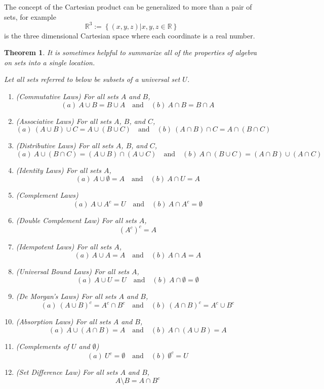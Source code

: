 \documentclass[
]{book}
\newtheorem{theorem}{Theorem}[chapter]
\theoremstyle{definition}
\theoremstyle{definition}
\theoremstyle{definition}
\theoremstyle{remark}
\begin{document}
The concept of the Cartesian product can be generalized to more than a pair of sets, for example \[\mathbb{R}^3:= \left\{ (x,y,z) \vert x,y,z\in \mathbb{R} \right\}\] is the three dimensional Cartesian space where each coordinate is a real number.

\begin{theorem}
\protect\hypertarget{thm:set-identities}{}{\label{thm:set-identities} }It is sometimes helpful to summarize all of the properties of algebra on sets into a single location.

Let all sets referred to below be subsets of a universal set \(U\).

\begin{enumerate}
\def\labelenumi{\arabic{enumi}.}
\item
  (Commutative Laws) For all sets \(A\) and \(B\),
  \[(a) \: A \cup B = B \cup A \quad \mbox{and} \quad (b) \: A \cap B = B \cap A\]
\item
  (Associative Laws) For all sets \(A\), \(B\), and \(C\),
  \[(a) \: (A\cup B)\cup C = A \cup (B \cup C) \quad \mbox{and} \quad (b) \: (A \cap B) \cap C = A \cap (B\cap C)\]
\item
  (Distributive Laws) For all sets \(A\), \(B\), and \(C\),
  \[(a) \: A \cup (B \cap C) = (A \cup B)\cap (A \cup C) \quad \mbox{and} \quad (b) \: A \cap (B \cup C) = (A \cap B)\cup (A \cap C)\]
\item
  (Identity Laws) For all sets \(A\),
  \[(a) \: A \cup \emptyset = A \quad \mbox{and} \quad (b) \: A \cap U = A\]
\item
  (Complement Laws)
  \[(a) \: A \cup A^c = U \quad \mbox{and} \quad (b) \: A \cap A^c = \emptyset\]
\item
  (Double Complement Law) For all sets \(A\),
  \[(A^c)^c =A\]
\item
  (Idempotent Laws) For all sets \(A\),
  \[(a) \: A\cup A=A \quad \mbox{and} \quad (b) \: A \cap A =A\]
\item
  (Universal Bound Laws) For all sets \(A\),
  \[(a) \: A \cup U = U\quad \mbox{and} \quad (b) \: A \cap \emptyset = \emptyset\]
\item
  (De Morgan's Laws) For all sets \(A\) and \(B\),
  \[(a) \: (A \cup B)^c = A^c \cap B^c\quad \mbox{and} \quad (b) \: (A \cap B)^c = A^c \cup B^c\]
\item
  (Absorption Laws) For all sets \(A\) and \(B\),
  \[(a) \: A \cup (A \cap B) = A \quad \mbox{and} \quad (b) \: A \cap (A \cup B ) = A\]
\item
  (Complements of \(U\) and \(\emptyset\))
  \[(a) \: U^c = \emptyset \quad \mbox{and} \quad (b) \: \emptyset^c = U\]
\item
  (Set Difference Law) For all sets \(A\) and \(B\),
  \[A\setminus B = A \cap B^c\]
\end{enumerate}
\end{theorem}
\end{document}
